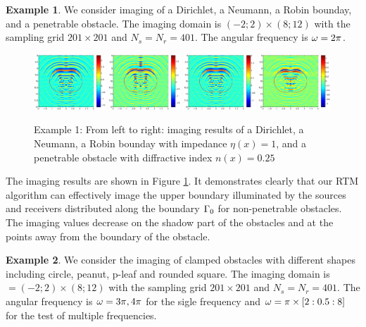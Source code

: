 \documentclass[12pt]{iopart}
\begin{document}
\bigskip
\textbf{Example 1}.
We consider imaging of a Dirichlet, a Neumann, a Robin bounday, and a penetrable obstacle. The imaging domain is $(−2; 2) \times (8; 12)$ with the sampling grid $201 \times 201$ and $N_s = N_r = 401$. The angular frequency is $\omega=2\pi$.
 \begin{figure}
 	\centering
 	\includegraphics[width=0.24\textwidth]{./graphic/peanut_3pi.eps}
 	\includegraphics[width=0.24\textwidth]{./graphic/peanut_3pi_neumann.eps}
 	\includegraphics[width=0.24\textwidth]{./graphic/peanut_3pi_impedance_1.eps}
 	\includegraphics[width=0.24\textwidth]{./graphic/peanut_3pi_transmission.eps}
 	\caption{Example 1: From left to right: imaging results of a Dirichlet, a Neumann, a Robin bounday with impedance $\eta(x)=1$, and a penetrable obstacle with diffractive index $n(x)=0.25$}\label{figure_1}
 \end{figure}
 
 The imaging results are shown in Figure \ref{figure_1}. It demonstrates clearly that our RTM
 algorithm can effectively image the upper boundary illuminated by the sources and
 receivers distributed along the boundary $\Gamma_0$ for non-penetrable obstacles. The imaging
 values decrease on the shadow part of the obstacles and at the points away from the
 boundary of the obstacle.

\bigskip
\textbf{Example 2}. We consider the imaging of clamped obstacles with different shapes including circle, peanut, p-leaf and rounded square. The imaging domain is $ = (−2; 2) \times (8; 12)$ with the sampling grid $201 \times 201$ and $N_s = N_r = 401$. The angular frequency is $\omega = 3\pi,4\pi$ for the sigle frequency and $\omega=\pi\times[2:0.5:8]$ for the test of multiple frequencies.
\end{document}
